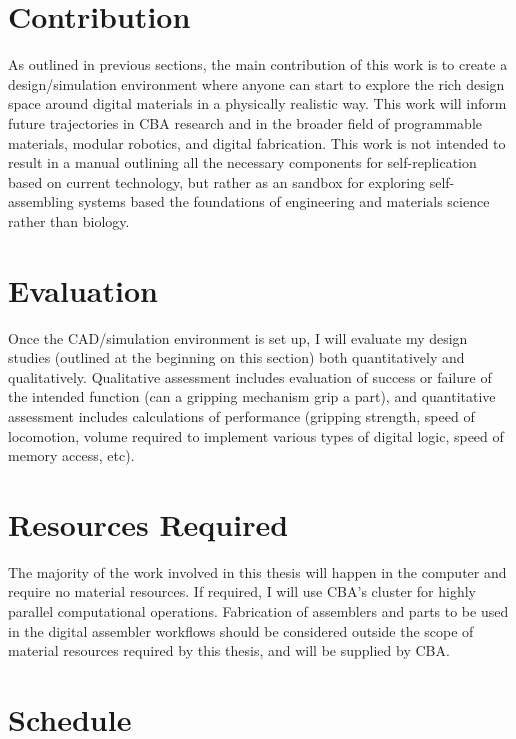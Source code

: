 {\section{Contribution}

As outlined in previous sections, the main contribution of this work is to create a design/simulation environment where anyone can start to explore the rich design space around digital materials in a physically realistic way.  This work will inform future trajectories in CBA research and in the broader field of programmable materials, modular robotics, and digital fabrication.  This work is not intended to result in a manual outlining all the necessary components for self-replication based on current technology, but rather as an sandbox for exploring self-assembling systems based the foundations of engineering and materials science rather than biology.

\section{Evaluation}

Once the CAD/simulation environment is set up, I will evaluate my design studies (outlined at the beginning on this section) both quantitatively and qualitatively.  Qualitative assessment includes evaluation of success or failure of the intended function (can a gripping mechanism grip a part), and quantitative assessment includes calculations of performance (gripping strength, speed of locomotion, volume required to implement various types of digital logic, speed of memory access, etc).

\section{Resources Required}

The majority of the work involved in this thesis will happen in the computer and require no material resources.  If required, I will use CBA's cluster for highly parallel computational operations.  Fabrication of assemblers and parts to be used in the digital assembler workflows should be considered outside the scope of material resources required by this thesis, and will be supplied by CBA.

\section{Schedule}

}
